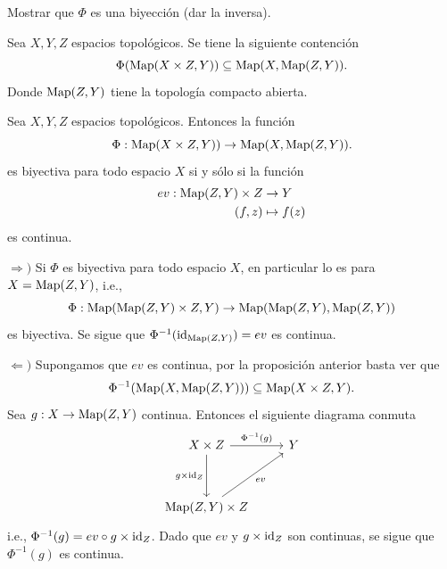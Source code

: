 \begin{ejercicio}
    Mostrar que $\Phi$ es una biyección (dar la inversa).
\end{ejercicio}
\begin{prop}
    Sea $X,Y,Z$ espacios topológicos. Se tiene la siguiente contención 
    \begin{equation*}
        \Phi(\mathrm{Map}(X\times Z,Y))\subseteq \mathrm{Map}(X,\mathrm{Map}(Z,Y)).
    \end{equation*}
    Donde $\mathrm{Map}(Z,Y)$ tiene la topología compacto abierta.
\end{prop}
\begin{prop}
    Sea $X,Y,Z$ espacios topológicos. Entonces la función
    \begin{equation*}
        \Phi:\mathrm{Map}(X\times Z,Y))\to \mathrm{Map}(X,\mathrm{Map}(Z,Y)).
    \end{equation*}    
    es biyectiva para todo espacio $X$ si y sólo si la función
    \begin{align*}
        ev:\mathrm{Map}(Z,Y)\times Z&\to Y\\
        (f,z)&\mapsto f(z)
    \end{align*}
   es continua.
\end{prop}
\begin{dem}
    $\Rightarrow)$ Si $\Phi$ es biyectiva para todo espacio $X$, en particular lo es para $X=\mathrm{Map}(Z,Y)$, i.e.,
    \begin{equation*}
        \Phi:\mathrm{Map}(\mathrm{Map}(Z,Y)\times Z,Y)\to\mathrm{Map}(\mathrm{Map}(Z,Y),\mathrm{Map}(Z,Y))
    \end{equation*}
    es biyectiva. Se sigue que $\Phi^{-1}(\mathrm{id}_{\mathrm{Map}(Z,Y)})=ev$ es continua.

    $\Leftarrow)$ Supongamos que $ev$ es continua, por la proposición anterior %
    basta ver que 
    $$
    \Phi^{-1}(\mathrm{Map}(X,\mathrm{Map}(Z,Y)))\subseteq 
    \mathrm{Map}(X\times Z,Y).
    $$
    Sea $g:X\to \mathrm{Map}(Z,Y)$ continua. Entonces el siguiente diagrama conmuta
    \begin{equation*}
        \begin{tikzcd}[row sep = 1.2cm]
            X\times Z\arrow[d, "g\times\id_Z"']\arrow[r, "\Phi^{-1}(g)"] &
            Y\\
            \map(Z,Y)\times Z  \arrow[ur, "ev"']
        \end{tikzcd}
    \end{equation*}
    i.e., $\Phi^{-1}(g)=ev\circ g\times\mathrm{id}_Z$. Dado que $ev$ y $g\times\mathrm{id}_Z$ son continuas, se sigue que $\Phi^{-1}(g)$ es continua.
\end{dem}
